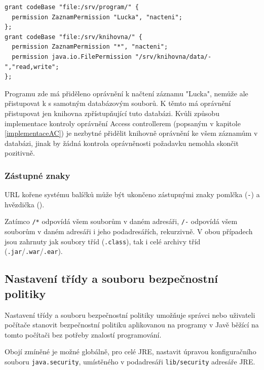 \begin{verbatim}
grant codeBase "file:/srv/program/" {
  permission ZaznamPermission "Lucka", "nacteni";
};
grant codeBase "file:/srv/knihovna/" {
  permission ZaznamPermission "*", "nacteni";
  permission java.io.FilePermission "/srv/knihovna/data/-","read,write";
};
\end{verbatim}

Programu zde má přiděleno oprávnění k načtení záznamu "Lucka", nemůže ale přistupovat k s samotným databázovým souborů. K těmto má oprávnění přistupovat jen knihovna zpřístupňující tuto databázi. Kvůli způsobu implementace kontroly oprávnění Access controllerem (popsaným v kapitole \ref{implementaceAC}) je nezbytné přidělit knihovně oprávnění ke všem záznamům v databázi, jinak by žádná kontrola oprávněnosti požadavku nemohla skončit pozitivně.

\subsubsection{Zástupné znaky}

URL kořene systému balíčků může být ukončeno zástupnými znaky pomlčka ({\tt -}) a hvězdička ({\tt *}).

Zatímco {\tt /*} odpovídá všem souborům v daném adresáři, {\tt /-} odpovídá všem souborům v daném adresáři i jeho podadresářích, rekurzivně. V obou případech jsou zahrnuty jak soubory tříd ({\tt .class}), tak i celé archivy tříd ({\tt .jar}/{\tt .war}/{\tt .ear}).
\cite{jdkdocPolicyFiles}

\subsection{Nastavení třídy a souboru bezpečnostní politiky}\label{souborPolitiky}

Nastavení třídy a souboru bezpečnostní politiky umožňuje správci nebo uživateli počítače stanovit bezpečnostní politiku aplikovanou na programy v Javě běžící na tomto počítači bez potřeby znalostí programování.

Obojí zmíněné je možné globálně, pro celé JRE, nastavit úpravou konfiguračního souboru {\tt java.security}, umístěného v podadresáři {\tt lib/security} adresáře JRE. \cite{refPolicyFiles}

